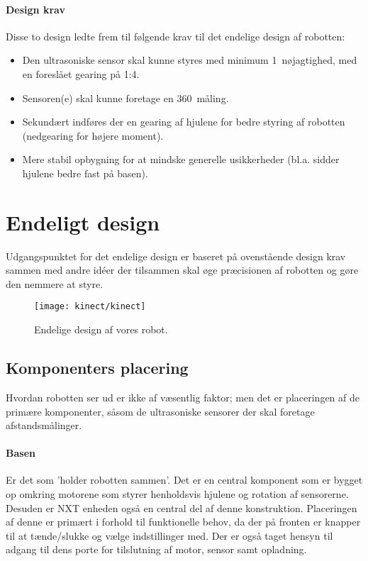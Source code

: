 \paragraph{Design krav}
Disse to design ledte frem til følgende krav til det endelige design af robotten:

\begin{itemize}
\item Den ultrasoniske sensor skal kunne styres med  minimum 1\degree~nøjagtighed, med en foreslået gearing på 1:4.
\item Sensoren(e) skal kunne foretage en 360\degree~måling.
\item Sekundært indføres der en gearing af hjulene for bedre styring af robotten (nedgearing for højere moment).
\item Mere stabil opbygning for at mindske generelle usikkerheder (bl.a. sidder hjulene bedre fast på basen).
\end{itemize} 


\section{Endeligt design}
Udgangspunktet for det endelige design er baseret på ovenstående design krav sammen med andre idéer der tilsammen skal øge præcisionen af robotten og gøre den nemmere at styre.

\begin{figure}
\centering
\texttt{[image: kinect/kinect]}
\caption{Endelige design af vores robot.}
\label{robot:opbygning}
\end{figure}

\subsection{Komponenters placering}
Hvordan robotten ser ud er ikke af væsentlig faktor; men det er placeringen af de primære komponenter, såsom de ultrasoniske sensorer der skal foretage afstandsmålinger.


\paragraph{Basen}
Er det som 'holder robotten sammen'.
Det er en central komponent som er bygget op omkring motorene som styrer henholdsvis hjulene og rotation af sensorerne.
Desuden er NXT enheden også en central del af denne konstruktion.
Placeringen af denne er primært i forhold til funktionelle behov, da der på fronten er knapper til at tænde/slukke og vælge indstillinger med.
Der er også taget hensyn til adgang til dens porte for tilslutning af motor, sensor samt opladning.

